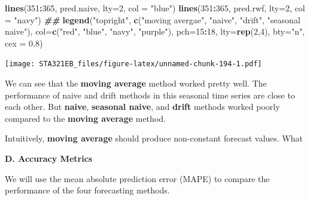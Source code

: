 \documentclass[
]{book}
\newenvironment{Shaded}{\begin{snugshade}}{\end{snugshade}}
\newcommand{\AttributeTok}[1]{\textcolor[rgb]{0.13,0.29,0.53}{#1}}
\newcommand{\DecValTok}[1]{\textcolor[rgb]{0.00,0.00,0.81}{#1}}
\newcommand{\DocumentationTok}[1]{\textcolor[rgb]{0.56,0.35,0.01}{\textbf{\textit{#1}}}}
\newcommand{\FloatTok}[1]{\textcolor[rgb]{0.00,0.00,0.81}{#1}}
\newcommand{\FunctionTok}[1]{\textcolor[rgb]{0.13,0.29,0.53}{\textbf{#1}}}
\newcommand{\NormalTok}[1]{#1}
\newcommand{\SpecialCharTok}[1]{\textcolor[rgb]{0.81,0.36,0.00}{\textbf{#1}}}
\newcommand{\StringTok}[1]{\textcolor[rgb]{0.31,0.60,0.02}{#1}}
\begin{document}
\begin{Shaded}
\begin{Highlighting}[]
\FunctionTok{lines}\NormalTok{(}\DecValTok{351}\SpecialCharTok{:}\DecValTok{365}\NormalTok{, pred.naive, }\AttributeTok{lty=}\DecValTok{2}\NormalTok{, }\AttributeTok{col =} \StringTok{"blue"}\NormalTok{)}
\FunctionTok{lines}\NormalTok{(}\DecValTok{351}\SpecialCharTok{:}\DecValTok{365}\NormalTok{, pred.rwf, }\AttributeTok{lty=}\DecValTok{2}\NormalTok{, }\AttributeTok{col =} \StringTok{"navy"}\NormalTok{)}
\DocumentationTok{\#\# }
\FunctionTok{legend}\NormalTok{(}\StringTok{"topright"}\NormalTok{, }\FunctionTok{c}\NormalTok{(}\StringTok{"moving avergae"}\NormalTok{, }\StringTok{"naive"}\NormalTok{, }\StringTok{"drift"}\NormalTok{, }\StringTok{"seasonal naive"}\NormalTok{),}
       \AttributeTok{col=}\FunctionTok{c}\NormalTok{(}\StringTok{"red"}\NormalTok{, }\StringTok{"blue"}\NormalTok{, }\StringTok{"navy"}\NormalTok{, }\StringTok{"purple"}\NormalTok{), }\AttributeTok{pch=}\DecValTok{15}\SpecialCharTok{:}\DecValTok{18}\NormalTok{, }\AttributeTok{lty=}\FunctionTok{rep}\NormalTok{(}\DecValTok{2}\NormalTok{,}\DecValTok{4}\NormalTok{),}
       \AttributeTok{bty=}\StringTok{"n"}\NormalTok{, }\AttributeTok{cex =} \FloatTok{0.8}\NormalTok{)}
\end{Highlighting}
\end{Shaded}

\texttt{[image: STA321EB\_files/figure-latex/unnamed-chunk-194-1.pdf]}

We can see that the \textbf{moving average} method worked pretty well. The performance of naive and drift methods in this seasonal time series are close to each other. But \textbf{naive}, \textbf{seasonal naive}, and \textbf{drift} methods worked poorly compared to the \textbf{moving average} method.

Intuitively, \textbf{moving average} should produce non-constant forecast values. What

\textbf{D. Accuracy Metrics}

We will use the mean absolute prediction error (MAPE) to compare the performance of the four forecasting methods.
\end{document}
